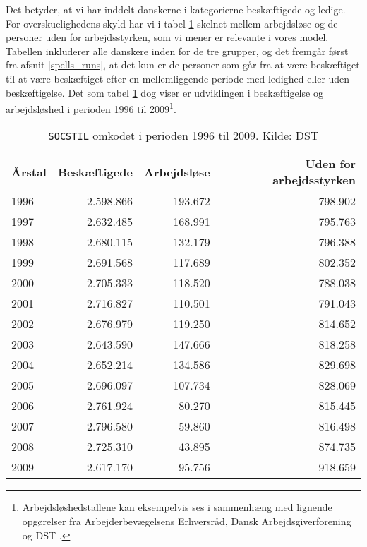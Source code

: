 Det betyder, at vi har inddelt danskerne i kategorierne beskæftigede og ledige. For overskuelighedens skyld har vi i tabel \ref{tab_SOCSTIL} skelnet mellem arbejdsløse og de personer uden for arbejdsstyrken, som vi mener er relevante i vores model. Tabellen inkluderer alle danskere inden for de tre grupper, og det fremgår først fra afsnit \ref{spells_runs}, at det kun er de personer som går fra at være beskæftiget til at være beskæftiget efter en mellemliggende periode med ledighed eller uden beskæftigelse. Det som tabel \ref{tab_SOCSTIL} dog viser er udviklingen i beskæftigelse og arbejdsløshed i perioden 1996 til 2009\footnote{Arbejdsløshedstallene kan eksempelvis ses i sammenhæng med lignende opgørelser fra Arbejderbevægelsens Erhversråd\parencite{Bjoersted2012}, Dansk Arbejdsgiverforening \parencite{Bang-Petersen2012} og DST \parencite{DST2014a}.}.
%
\begin{table}[H] \centering
\caption{\texttt{SOCSTIL} omkodet i perioden 1996 til 2009. Kilde: DST}
\label{tab_SOCSTIL}
\begin{tabular}{@{}lrrr@{}} \toprule
Årstal & \multicolumn{1}{c}{Beskæftigede} & \multicolumn{1}{c}{Arbejdsløse} & Uden for arbejdsstyrken \\ \midrule
1996  & 2.598.866 & 193.672 & 798.902 \\ 
1997  & 2.632.485 & 168.991 & 795.763 \\ 
1998  & 2.680.115 & 132.179 & 796.388 \\ 
1999  & 2.691.568 & 117.689 & 802.352 \\ 
2000  & 2.705.333 & 118.520 & 788.038 \\ 
2001  & 2.716.827 & 110.501 & 791.043 \\ 
2002  & 2.676.979 & 119.250 & 814.652 \\ 
2003  & 2.643.590 & 147.666 & 818.258 \\ 
2004  & 2.652.214 & 134.586 & 829.698 \\ 
2005  & 2.696.097 & 107.734 & 828.069 \\ 
2006  & 2.761.924 & 80.270  & 815.445 \\ 
2007  & 2.796.580 & 59.860  & 816.498 \\ 
2008  & 2.725.310 & 43.895  & 874.735 \\ 
2009  & 2.617.170 & 95.756  & 918.659 \\  \bottomrule
\end{tabular} \end{table}
% 

